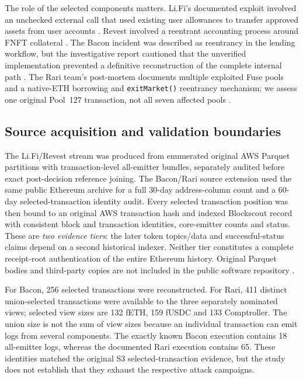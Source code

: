 \documentclass[preprint,12pt,authoryear]{elsarticle}
\begin{document}
The role of the selected components matters. Li.Fi's documented exploit involved an unchecked external call that used existing user allowances to transfer approved assets from user accounts \citep{LiFi2022Postmortem,BlockSec2022LiFi}. Revest involved a reentrant accounting process around FNFT collateral \citep{Revest2022Postmortem,SlowMist2022Revest}. The Bacon incident was described as reentrancy in the lending workflow, but the investigative report cautioned that the unverified implementation prevented a definitive reconstruction of the complete internal path \citep{Bacon2022Postmortem,Certik2022Bacon}. The Rari team's post-mortem documents multiple exploited Fuse pools and a native-ETH borrowing and \texttt{exitMarket()} reentrancy mechanism; we assess one original Pool~127 transaction, not all seven affected pools \citep{Rari2022Postmortem,Beosin2022Rari}.

\subsection{Source acquisition and validation boundaries}
The Li.Fi/Revest stream was produced from enumerated original AWS Parquet partitions with transaction-level all-emitter bundles, separately audited before exact post-decision reference joining. The Bacon/Rari source extension used the same public Ethereum archive for a full 30-day address-column count and a 60-day selected-transaction identity audit. Every selected transaction position was then bound to an original AWS transaction hash and indexed Blockscout record with consistent block and transaction identities, core-emitter counts and status. These are \emph{two evidence tiers}: the later token topics/data and successful-status claims depend on a second historical indexer. Neither tier constitutes a complete receipt-root authentication of the entire Ethereum history. Original Parquet bodies and third-party copies are not included in the public software repository \citep{AWS2026Dataset}.

For Bacon, 256 selected transactions were reconstructed. For Rari, 411 distinct union-selected transactions were available to the three separately nominated views; selected view sizes are 132 fETH, 159 fUSDC and 133 Comptroller. The union size is not the sum of view sizes because an individual transaction can emit logs from several components. The exactly known Bacon execution contains 18 all-emitter logs, whereas the documented Rari execution contains 65. These identities matched the original S3 selected-transaction evidence, but the study does not establish that they exhaust the respective attack campaigns.
\end{document}
